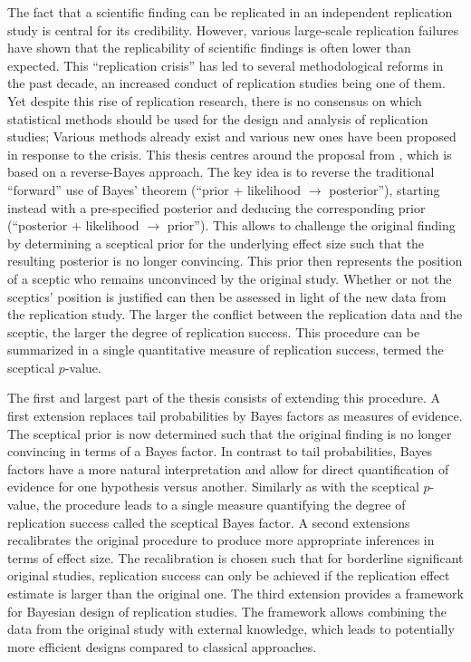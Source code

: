 The fact that a scientific finding can be replicated in an independent
replication study is central for its credibility. However, various large-scale
replication failures have shown that the replicability of scientific findings is
often lower than expected. This ``replication crisis'' has led to several
methodological reforms in the past decade, an increased conduct of replication
studies being one of them. Yet despite this rise of replication research, there
is no consensus on which statistical methods should be used for the design and
analysis of replication studies; Various methods already exist and various new
ones have been proposed in response to the crisis. This thesis centres around
the proposal from \citet{Held2020}, which is based on a reverse-Bayes approach.
The key idea is to reverse the traditional ``forward'' use of Bayes' theorem
(``prior + likelihood $\rightarrow$ posterior''), starting instead with a
pre-specified posterior and deducing the corresponding prior (``posterior +
likelihood $\rightarrow$
prior''). %
This allows to challenge the original finding by determining a sceptical prior
for the underlying effect size such that the resulting posterior is no longer
convincing. This prior then represents the position of a sceptic who remains
unconvinced by the original study. Whether or not the sceptics' position is
justified can then be assessed in light of the new data from the replication
study. The larger the conflict between the replication data and the sceptic, the
larger the degree of replication success. This procedure can be summarized in a
single quantitative measure of replication success, termed the sceptical
$p$-value.

The first and largest part of the thesis consists of extending this procedure. A
first extension replaces tail probabilities by Bayes factors as measures of
evidence. The sceptical prior is now determined such that the original finding
is no longer convincing in terms of a Bayes factor. In contrast to tail
probabilities, Bayes factors have a more natural interpretation and allow for
direct quantification of evidence for one hypothesis versus another. Similarly
as with the sceptical $p$-value, the procedure leads to a single measure
quantifying the degree of replication success called the sceptical Bayes factor.
A second extensions recalibrates the original procedure to produce more
appropriate inferences in terms of effect size. %
The recalibration is chosen such that for borderline significant original
studies, replication success can only be achieved if the replication effect
estimate is larger than the original one. The third extension provides a
framework for Bayesian design of replication studies. The framework allows
combining the data from the original study with external knowledge, which leads
to potentially more efficient designs compared to classical approaches.

